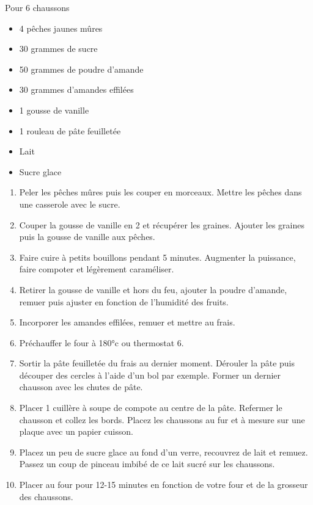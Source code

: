 \bigskip
{}
{Pour 6 chaussons}{
\begin{itemize}
	\item 4 pêches jaunes mûres
	\item 30 grammes de sucre
	\item 50 grammes de poudre d’amande
	\item 30 grammes d’amandes effilées
	\item 1 gousse de vanille
	\item 1 rouleau de pâte feuilletée
	\item Lait
	\item Sucre glace
\end{itemize}}
{\begin{enumerate}
	\item Peler les pêches mûres puis les couper en morceaux. Mettre les pêches dans une casserole avec le sucre. 
	\item Couper la gousse de vanille en 2 et récupérer les graines. Ajouter les graines puis la gousse de vanille aux pêches.
	\item Faire cuire à petits bouillons pendant 5 minutes. Augmenter la puissance, faire compoter et légèrement caraméliser.
	\item Retirer la gousse de vanille et hors du feu, ajouter la poudre d’amande, remuer puis ajuster en fonction de l’humidité des fruits.
	\item Incorporer les amandes effilées, remuer et mettre au frais.
	\item Préchauffer le four à 180°c ou thermostat 6.
	\item Sortir la pâte feuilletée du frais au dernier moment. Dérouler la pâte puis découper des cercles à l'aide d'un bol par exemple. Former un dernier chausson avec les chutes de pâte.
	\item Placer 1 cuillère à soupe de compote au centre de la pâte. Refermer le chausson et collez les bords. Placez les chaussons au fur et à mesure sur une plaque avec un papier cuisson.
	\item Placez un peu de sucre glace au fond d'un verre, recouvrez de lait et remuez. Passez un coup de pinceau imbibé de ce lait sucré sur les chaussons.
	\item Placer au four pour 12-15 minutes en fonction de votre four et de la grosseur des chaussons.
\end{enumerate}}


